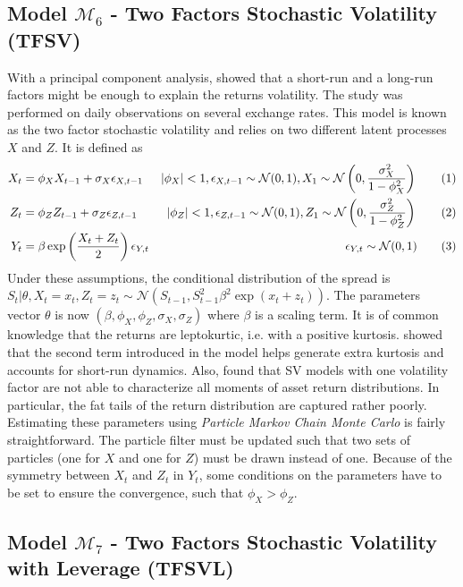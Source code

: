 \documentclass[11pt,a4,twosided,singlespacing,titlepagenumber=on]{scrreprt}
\numberwithin{equation}{chapter} %
\theoremstyle{remark}
\newcommand\numberthis{\addtocounter{equation}{1}\tag{\theequation}}
\begin{document}
\subsection{Model $\mathcal{M}_6$ - Two Factors Stochastic Volatility (TFSV)}
With a principal component analysis, \cite{harvey1994} showed that a short-run and a long-run factors might be enough to explain the returns volatility. The study was performed on daily observations on several exchange rates. This model is known as the two factor stochastic volatility and relies on two different latent processes $X$ and $Z$. It is defined as
\begin{align*}
  X_t 						&=  \phi_X X_{t-1} + \sigma_X \epsilon_{X,t-1} &|\phi_X| < 1, \epsilon_{X,t-1} \sim \mathcal{N}(0,1), X_1 \sim \mathcal{N} \left(0, \frac{\sigma_X^2}{1 - \phi_X^2} \right) \numberthis \label{tfsv_process_X} \\
  Z_t 						&=  \phi_Z Z_{t-1} + \sigma_Z \epsilon_{Z,t-1} &|\phi_Z| < 1, \epsilon_{Z,t-1} \sim \mathcal{N}(0,1), Z_1 \sim \mathcal{N} \left(0, \frac{\sigma_Z^2}{1 - \phi_Z^2} \right) \numberthis\\
  Y_t 						&=  \beta \exp \left( \frac{X_t+Z_t}{2} \right) \epsilon_{Y,t} &\epsilon_{Y,t} \sim \mathcal{N}(0,1) \numberthis
\end{align*}
Under these assumptions, the conditional distribution of the spread is $S_t | \theta, X_t = x_t, Z_t = z_t \sim \mathcal{N}\left(S_{t-1}, S_{t-1}^2 \beta^2 \exp \left(x_t + z_t\right) \right)$. The parameters vector $\theta$ is now $(\beta, \phi_X, \phi_Z, \sigma_X, \sigma_Z)$ where $\beta$ is a scaling term. It is of common knowledge that the returns are leptokurtic, i.e. with a positive kurtosis. \cite{veiga2006} showed that the second term introduced in the model helps generate extra kurtosis and accounts for short-run dynamics. Also, \cite{chernov2000} found that SV models with one volatility factor are not able to characterize all moments of asset return distributions. In particular, the fat tails of the return distribution are captured rather poorly. \\
Estimating these parameters using \textit{Particle Markov Chain Monte Carlo} is fairly straightforward. The particle filter must be updated such that two sets of particles (one for $X$ and one for $Z$) must be drawn instead of one. Because of the symmetry between $X_t$ and $Z_t$ in $Y_t$, some conditions on the parameters have to be set to ensure the convergence, such that $\phi_X > \phi_Z$.

\subsection{Model $\mathcal{M}_7$ - Two Factors Stochastic Volatility with Leverage (TFSVL)}
\end{document}
